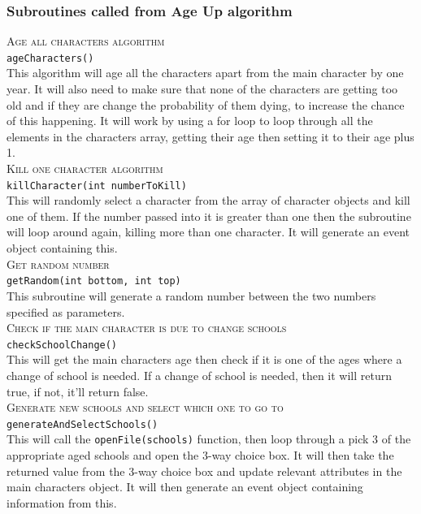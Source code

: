 \subsubsection{Subroutines called from Age Up algorithm}

\noindent \textsc{Age all characters algorithm}\\
\verb|ageCharacters()|\\
This algorithm will age all the characters apart from the main character by one year. It will also need to make sure that none of the characters are getting too old and if they are change the probability of them dying, to increase the chance of this happening.
It will work by using a for loop to loop through all the elements in the characters array, getting their age then setting it to their age plus 1.\\

\noindent \textsc{Kill one character algorithm}\\
\verb|killCharacter(int numberToKill)|\\
This will randomly select a character from the array of character objects and kill one of them. If the number passed into it is greater than one then the subroutine will loop around again, killing more than one character. It will generate an event object containing this.\\

\noindent \textsc{Get random number}\\
\verb|getRandom(int bottom, int top)|\\
This subroutine will generate a random number between the two numbers specified as parameters.\\

\noindent \textsc{Check if the main character is due to change schools}\\
\verb|checkSchoolChange()|\\
This will get the main character\textquotesingle s age then check if it is one of the ages where a change of school is needed. If a change of school is needed, then it will return true, if not, it’ll return false.\\

\noindent \textsc{Generate new schools and select which one to go to}\\
\verb|generateAndSelectSchools()|\\
This will call the \verb|openFile(schools)| function, then loop through a pick 3 of the appropriate aged schools and open the 3-way choice box. It will then take the returned value from the 3-way choice box and update relevant attributes in the main character\textquotesingle s object. It will then generate an event object containing information from this.\\

